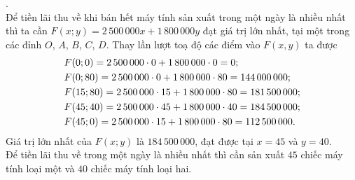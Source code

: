 \begin{ex}
{\begin{itemchoice}
			.\\
			Để tiền lãi thu về khi bán hết máy tính sản xuất trong một ngày là nhiều nhất thì ta cần $F(x;y)=2\,500\,000 x+ 1\,800\,000y$ đạt giá trị lớn nhất, tại một trong các đỉnh $O$, $A$, $B$, $C$, $D$. Thay lần lượt toạ độ các điểm vào $F(x,y)$ ta được
			\begin{align*} \allowdisplaybreaks
				&F(0;0)=2\,500\,000 \cdot 0+ 1\,800\,000\cdot 0 = 0; \\
				&F(0;80)=2\,500\,000 \cdot 0+ 1\,800\,000\cdot 80 = 144\,000\,000; \\
				&F(15;80)=2\,500\,000 \cdot 15+ 1\,800\,000\cdot 80 = 181\,500\,000;\\
				& F(45;40)=2\,500\,000 \cdot 45+ 1\,800\,000\cdot 40 = 184\,500\,000;\\
				&F(45;0)=2\,500\,000 \cdot 15+ 1\,800\,000\cdot 80 = 112\,500\,000.
			\end{align*}
			Giá trị lớn nhất của $F(x;y)$ là $184\,500\,000$, đạt được tại $x=45$ và $y=40$.\\
			Để tiền lãi thu về trong một ngày là nhiều nhất thì cần sản xuất $45$ chiếc máy tính loại một và $40$ chiếc máy tính loại hai.
		\end{itemchoice}
	}
\end{ex}

